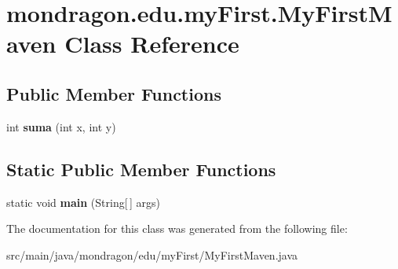 \hypertarget{classmondragon_1_1edu_1_1my_first_1_1_my_first_maven}{}\section{mondragon.\+edu.\+my\+First.\+My\+First\+Maven Class Reference}
\label{classmondragon_1_1edu_1_1my_first_1_1_my_first_maven}
\subsection*{Public Member Functions}
\begin{DoxyCompactItemize}
\item 
\mbox{\label{classmondragon_1_1edu_1_1my_first_1_1_my_first_maven_aa3403a3261b843fb3e82629a7578cc34}} 
int {\bfseries suma} (int x, int y)
\end{DoxyCompactItemize}
\subsection*{Static Public Member Functions}
\begin{DoxyCompactItemize}
\item 
\mbox{\label{classmondragon_1_1edu_1_1my_first_1_1_my_first_maven_aaeaa853156a7fde1ab1ad5c7468d4d2b}} 
static void {\bfseries main} (String\mbox{[}$\,$\mbox{]} args)
\end{DoxyCompactItemize}


The documentation for this class was generated from the following file\+:\begin{DoxyCompactItemize}
\item 
src/main/java/mondragon/edu/my\+First/My\+First\+Maven.\+java\end{DoxyCompactItemize}
